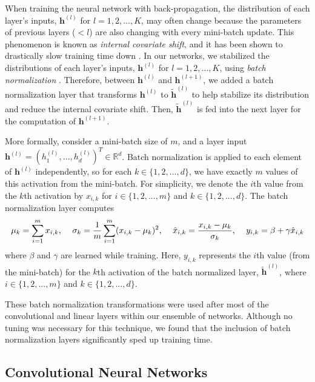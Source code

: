 \documentclass [MAS] {uclathes}
\begin{document}
When training the neural network with back-propagation, the distribution of each layer's inputs, $\mathbf{h}^{(l)}$ for $l=1, 2, ..., K$, may often change because the parameters of previous layers ($< l$) are also changing with every mini-batch update. This phenomenon is known as \textit{internal covariate shift}, and it has been shown to drastically slow training time down \cite{BatchNorm}. In our networks, we stabilized the distributions of each layer's inputs, $\mathbf{h}^{(l)}$ for $l=1, 2, ..., K$, using \textit{batch normalization} \cite{BatchNorm}. Therefore, between $\mathbf h^{(l)}$ and $\mathbf h^{(l+1)}$, we added a batch normalization layer that transforms $\mathbf{h}^{(l)}$ to $\tilde{\mathbf{h}}^{(l)}$ to help stabilize its distribution and reduce the internal covariate shift. Then, $\tilde{\mathbf{h}}^{(l)}$ is fed into the next layer for the computation of $\mathbf{h}^{(l+1)}$. 

More formally, consider a mini-batch size of $m$, and a layer input $\mathbf{h}^{(l)} = (h^{(l)}_1, ..., h^{(l)}_d)^T \in \mathbb{R}^d$. Batch normalization is applied to each element of $\mathbf{h}^{(l)}$ independently, so for each $k \in \{1, 2, ..., d \}$, we have exactly $m$ values of this activation from the mini-batch. For simplicity, we denote the $i$th value from the $k$th activation by $x_{i,k}$ for $i \in \{1, 2, ..., m \}$ and $k \in \{1, 2, ..., d \}$. The batch normalization layer computes $$\mu_k = \sum_{i=1}^{m} x_{i, k} \text{, \quad} \sigma_k = \frac{1}{m} \sum_{i=1}^{m} (x_{i, k} - \mu_k)^2 \text{, \quad} \hat{x}_{i,k} = \frac{x_{i,k} - \mu_k}{\sigma_k} \text{, \quad} y_{i, k} = \beta + \gamma \hat{x}_{i,k}$$ where $\beta$ and $\gamma$ are learned while training. Here, $y_{i, k}$ represents the $i$th value (from the mini-batch) for the $k$th activation of the batch normalized layer, $\tilde{\mathbf{h}}^{(l)}$, where $i \in \{1, 2, ..., m \}$ and $k \in \{1, 2, ..., d \}$.

These batch normalization transformations were used after most of the convolutional and linear layers within our ensemble of networks. Although no tuning was necessary for this technique, we found that the inclusion of batch normalization layers significantly sped up training time.


\subsection{Convolutional Neural Networks}
\end{document}
